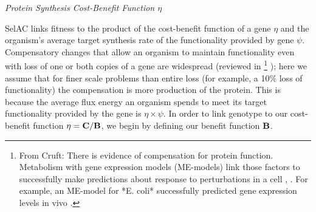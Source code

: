 \documentclass[12pt,letterpaper]{article}
\renewcommand{\subsection}[1]{%
\bigskip
\begin{center}
\begin{large}
\normalfont\itshape #1
\end{large}
\end{center}}
\newcommand{\Cost}{\ensuremath{\text{\textbf{C}}}\xspace}
\newcommand{\Func}{\ensuremath{\text{\textbf{B}}}\xspace}
\newcommand{\selac}{SelAC\xspace}
\begin{document}
\subsection{Protein Synthesis Cost-Benefit Function $\eta$}
\selac links fitness to the product of the cost-benefit function of a gene  $\eta$ and the organism's average target synthesis rate of the functionality provided by gene $\psi$.
Compensatory changes that allow an organism to maintain functionality even with loss of one or both copies of a gene are widespread (reviewed in \cite{}\footnote{From Cruft: 
There is evidence of compensation for protein function. Metabolism with gene expression models (ME-models) link those factors to successfully make predictions about response to perturbations in a cell \citep{https://www.nature.com/articles/ncomms1928}, \citep{https://www.sciencedirect.com/science/article/pii/S0958166914002316}. For example, an ME-model for *E. coli* successfully predicted gene expression levels in vivo \citep{http://journals.plos.org/plosone/article?id=10.1371/journal.pone.0045635}.
}
); here we assume that for finer scale problems than entire loss (for example, a 10\% loss of functionality) the compensation is more production of the protein.
This is because the average flux energy an organism spends to meet its target functionality provided by the gene is $\eta \times \psi$.
In order to link genotype to our cost-benefit function $\eta = \Cost/\Func$, we begin by defining our benefit function \Func.
\end{document}
